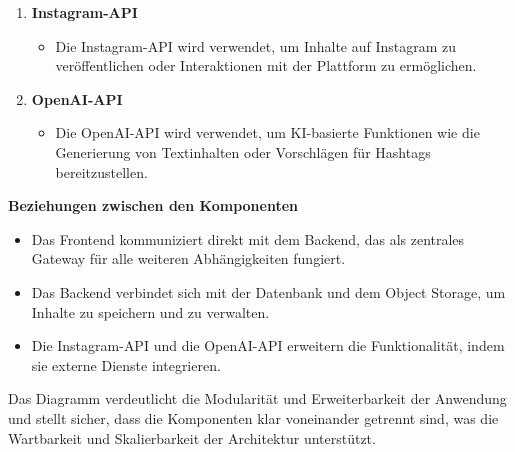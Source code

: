 \begin{enumerate}
    \item \textbf{Instagram-\ac{API}}
    \begin{itemize}
        \item Die Instagram-\ac{API} wird verwendet, um Inhalte auf Instagram zu veröffentlichen oder Interaktionen mit der Plattform zu ermöglichen.
    \end{itemize}
    
    \item \textbf{OpenAI-\ac{API}}
    \begin{itemize}
        \item Die OpenAI-\ac{API} wird verwendet, um KI-basierte Funktionen wie die Generierung von Textinhalten oder Vorschlägen für Hashtags bereitzustellen.
    \end{itemize}
\end{enumerate}

\textbf{Beziehungen zwischen den Komponenten}
\begin{itemize}
    \item Das Frontend kommuniziert direkt mit dem Backend, das als zentrales Gateway für alle weiteren Abhängigkeiten fungiert.
    \item Das Backend verbindet sich mit der Datenbank und dem Object Storage, um Inhalte zu speichern und zu verwalten.
    \item Die Instagram-\ac{API} und die OpenAI-\ac{API} erweitern die Funktionalität, indem sie externe Dienste integrieren.
\end{itemize}

Das Diagramm verdeutlicht die Modularität und Erweiterbarkeit der Anwendung und stellt sicher, dass die Komponenten klar voneinander getrennt sind, was die Wartbarkeit und Skalierbarkeit der 
Architektur unterstützt.
